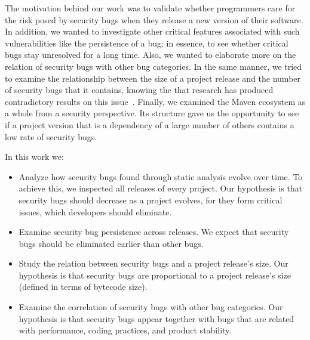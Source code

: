 \documentclass{sig-alternate}
\begin{document}
The motivation behind our work was to validate whether programmers care for
the risk posed by security bugs when they release a new version of their software.
In addition, we wanted to investigate other critical features associated with such
vulnerabilities like the persistence of a bug;
in essence, to see whether critical bugs stay unresolved for a long time.
Also, we wanted to elaborate more on the relation of security
bugs with other bug categories.
In the same manner, we tried to examine the relationship
between the size of a project release and the number of security bugs that it contains,
knowing the that research has produced contradictory results on this
issue~\cite{SYTP85,NBZ06,GKMS00}.
Finally, we examined the Maven ecosystem as a whole from a security
perspective. Its structure gave us the opportunity to see if a project version that is a dependency of
a large number of others contains a low rate of security bugs.

In this work we:
\begin{itemize}
	\item Analyze how security bugs found through static analysis
evolve over time. To achieve this, we inspected all releases of every project.
Our hypothesis is that security bugs should decrease as a project evolves,
for they form critical issues, which developers should eliminate.
	\item Examine security bug persistence across releases. 
We expect that security bugs should be eliminated earlier than other bugs.
	\item Study the relation between security bugs and a project
release's size. Our hypothesis is that security bugs are proportional to a project
release's size (defined in terms of bytecode size).
	\item Examine the correlation of security bugs with other bug categories.
Our hypothesis is that security bugs appear together with bugs that
are related with performance, coding practices, and product stability.
\end{itemize}
\end{document}
